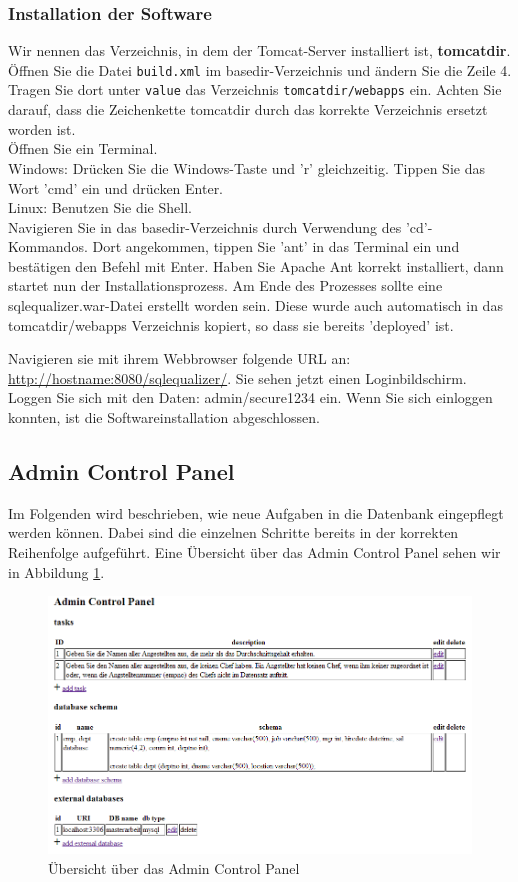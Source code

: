 \documentclass[12pt]{scrreprt}
\theoremstyle{remark}
\begin{document}
\subsubsection{Installation der Software}

Wir nennen das Verzeichnis, in dem der Tomcat-Server installiert ist, \textbf{tomcatdir}.
Öffnen Sie die Datei \verb|build.xml| im basedir-Verzeichnis und ändern Sie die Zeile 4. Tragen Sie dort unter \verb|value| das Verzeichnis \verb|tomcatdir/webapps| ein. Achten Sie darauf, dass die Zeichenkette tomcatdir durch das korrekte Verzeichnis ersetzt worden ist.\\

Öffnen Sie ein Terminal.\\
Windows: Drücken Sie die Windows-Taste und 'r' gleichzeitig. Tippen Sie das Wort 'cmd' ein und drücken Enter.\\
Linux: Benutzen Sie die Shell.\\

Navigieren Sie in das basedir-Verzeichnis durch Verwendung des 'cd'-Kommandos. Dort angekommen, tippen Sie 'ant' in das Terminal ein und bestätigen den Befehl mit Enter. Haben Sie Apache Ant korrekt installiert, dann startet nun der Installationsprozess. Am Ende des Prozesses sollte eine sqlequalizer.war-Datei erstellt worden sein. Diese wurde auch automatisch in das tomcatdir/webapps Verzeichnis kopiert, so dass sie bereits 'deployed' ist. 

Navigieren sie mit ihrem Webbrowser folgende URL an: \url{http://hostname:8080/sqlequalizer/}. Sie sehen jetzt einen Loginbildschirm. Loggen Sie sich mit den Daten: admin/secure1234 ein. Wenn Sie sich einloggen konnten, ist die Softwareinstallation abgeschlossen.

\subsection{Admin Control Panel}

Im Folgenden wird beschrieben, wie neue Aufgaben in die Datenbank eingepflegt werden können. Dabei sind die einzelnen Schritte bereits in der korrekten Reihenfolge aufgeführt. Eine Übersicht über das Admin Control Panel sehen wir in Abbildung \ref{fig:acp}.

\begin{figure}[H]
\centering
\includegraphics[scale=0.51]{Bilder/screen_acp_2.png}
\caption{Übersicht über das Admin Control Panel}
\label{fig:acp}
\end{figure}
\end{document}
